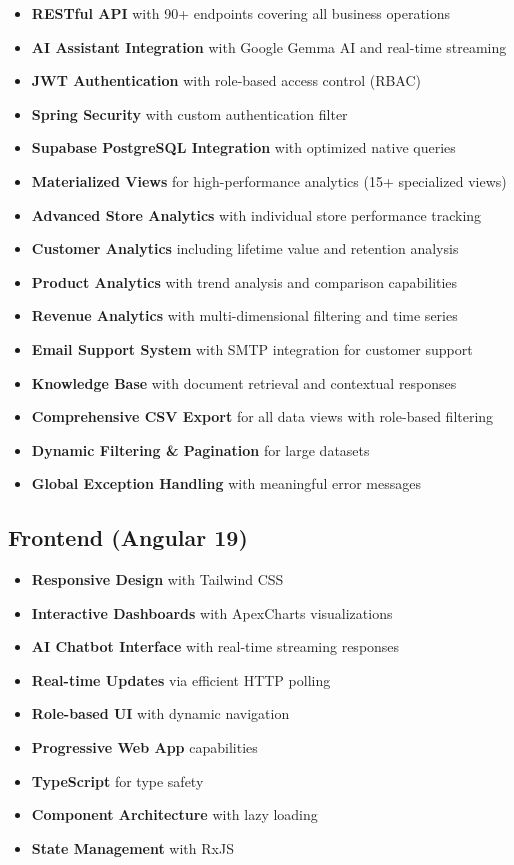 \documentclass[11pt,a4paper]{article}
\begin{document}
\begin{itemize}[leftmargin=*]
    \item \textbf{RESTful API} with 90+ endpoints covering all business operations
    \item \textbf{AI Assistant Integration} with Google Gemma AI and real-time streaming
    \item \textbf{JWT Authentication} with role-based access control (RBAC)
    \item \textbf{Spring Security} with custom authentication filter
    \item \textbf{Supabase PostgreSQL Integration} with optimized native queries
    \item \textbf{Materialized Views} for high-performance analytics (15+ specialized views)
    \item \textbf{Advanced Store Analytics} with individual store performance tracking
    \item \textbf{Customer Analytics} including lifetime value and retention analysis
    \item \textbf{Product Analytics} with trend analysis and comparison capabilities
    \item \textbf{Revenue Analytics} with multi-dimensional filtering and time series
    \item \textbf{Email Support System} with SMTP integration for customer support
    \item \textbf{Knowledge Base} with document retrieval and contextual responses
    \item \textbf{Comprehensive CSV Export} for all data views with role-based filtering
    \item \textbf{Dynamic Filtering \& Pagination} for large datasets
    \item \textbf{Global Exception Handling} with meaningful error messages
\end{itemize}

\subsection{Frontend (Angular 19)}

\begin{itemize}[leftmargin=*]
    \item \textbf{Responsive Design} with Tailwind CSS
    \item \textbf{Interactive Dashboards} with ApexCharts visualizations
    \item \textbf{AI Chatbot Interface} with real-time streaming responses
    \item \textbf{Real-time Updates} via efficient HTTP polling
    \item \textbf{Role-based UI} with dynamic navigation
    \item \textbf{Progressive Web App} capabilities
    \item \textbf{TypeScript} for type safety
    \item \textbf{Component Architecture} with lazy loading
    \item \textbf{State Management} with RxJS
\end{itemize}
\end{document}
